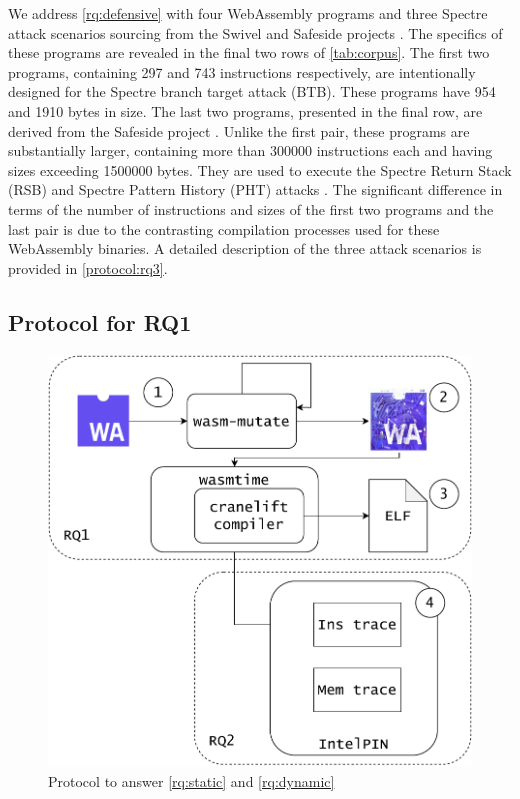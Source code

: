 \documentclass[a4paper,fleqn]{cas-dc}
\newcommand{\Wasm}{WebAssembly\xspace}
\begin{document}
We address \ref{rq:defensive} with four \Wasm programs and three Spectre attack scenarios sourcing from the Swivel and Safeside projects \cite{Swivel,safeside}. 
The specifics of these programs are revealed in the final two rows of \autoref{tab:corpus}.
The first two programs, containing 297 and 743 instructions respectively, are intentionally designed for the Spectre branch target attack (BTB).
These programs have 954 and 1910 bytes in size. 
The last two programs, presented in the final row, are derived from the Safeside project \cite{safeside}. 
Unlike the first pair, these programs are substantially larger, containing more than 300000 instructions each and having sizes exceeding 1500000 bytes. 
They are used to execute the Spectre Return Stack (RSB) and Spectre Pattern History (PHT) attacks \cite{Spectre}. 
The significant difference in terms of the number of instructions and sizes of the first two programs and the last pair is due to the contrasting compilation processes used for these \Wasm binaries. 
A detailed description of the three attack scenarios is provided in \autoref{protocol:rq3}.


\subsection{Protocol for RQ1}
\label{protocol:rq1}

\begin{figure}
    \centering
    \includegraphics[width=0.8\linewidth]{figures/protocol.pdf}
    \caption{Protocol to answer \ref{rq:static} and \ref{rq:dynamic}}
  \label{protocol}
\end{figure}
\end{document}
